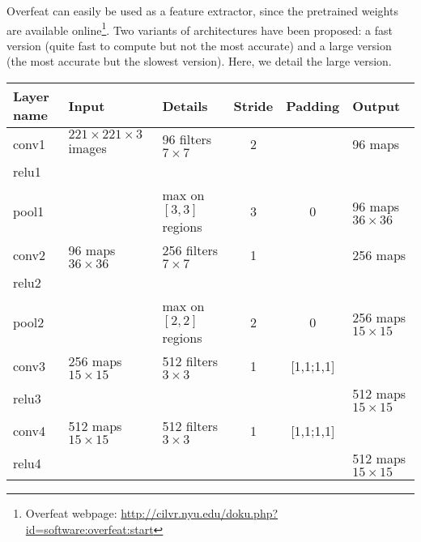 Overfeat can easily be used as a feature extractor, since the pretrained weights are available online\footnote{Overfeat webpage: 
\url{http://cilvr.nyu.edu/doku.php?id=software:overfeat:start}}. 
Two variants of architectures have been proposed: a fast version (quite fast to compute but not the most accurate) and a large version (the most 
accurate but the slowest version). Here, we detail the large version. 

\begin{table}[h]
\begin{center}
 \begin{tabular}{|l||l||l|c|c||l|}
   \hline
   Layer name & Input                            & Details                                 & Stride & Padding   & Output                   \\
   \hline
   \hline
   conv1      & $221 \times 221 \times 3$ images & 96 filters $7 \times 7$                 & 2      &           & 96 maps                  \\
   relu1      &                                  &                                         &        &           &                          \\
   pool1      &                                  & max on $[3,3]$ regions                  & 3      & 0         & 96 maps $36 \times 36$   \\
   \hline
   conv2      & 96 maps $36 \times 36$           & 256 filters $7 \times 7$                & 1      &           & 256 maps                 \\
   relu2      &                                  &                                         &        &           &                          \\
   pool2      &                                  & max on $[2,2]$ regions                  & 2      & 0         & 256 maps $15 \times 15$  \\
   \hline
   conv3      & 256 maps $15 \times 15$          & 512 filters $3 \times 3$                & 1      & [1,1;1,1] &                          \\
   relu3      &                                  &                                         &        &           & 512 maps $15 \times 15$  \\
   \hline
   conv4      & 512 maps $15 \times 15$          & 512 filters $3 \times 3$                & 1      & [1,1;1,1] &                          \\
   relu4      &                                  &                                         &        &           & 512 maps $15 \times 15$  \\

\end{tabular}
\end{center}
\end{table}
